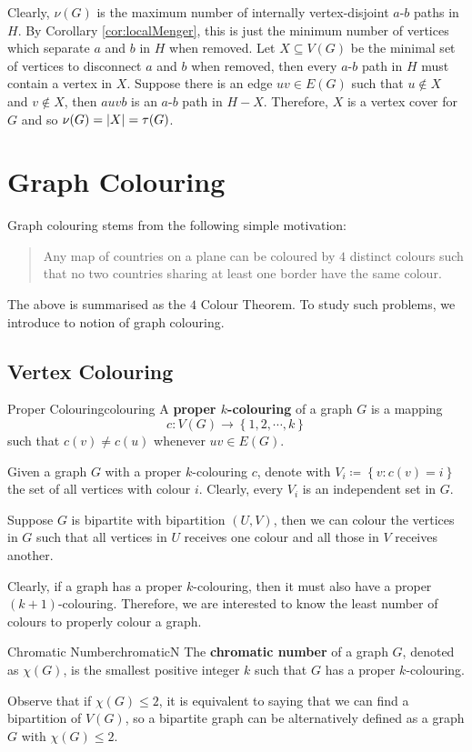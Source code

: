 \documentclass[math, code]{amznotes}
\theoremstyle{remark}
\begin{document}
Clearly, $\nu(G)$ is the maximum number of internally vertex-disjoint $a$-$b$ paths in $H$. By Corollary \ref{cor:localMenger}, this is just the minimum number of vertices which separate $a$ and $b$ in $H$ when removed. Let $X \subseteq V(G)$ be the minimal set of vertices to disconnect $a$ and $b$ when removed, then every $a$-$b$ path in $H$ must contain a vertex in $X$. Suppose there is an edge $uv \in E(G)$ such that $u \notin X$ and $v \notin X$, then $auvb$ is an $a$-$b$ path in $H - X$. Therefore, $X$ is a vertex cover for $G$ and so $\nu(G) = {\left\lvert {X} \right\rvert} = \tau(G)$.
\chapter{Graph Colouring}
Graph colouring stems from the following simple motivation:
\begin{quote}
    Any map of countries on a plane can be coloured by $4$ distinct colours such that no two countries sharing at least one border have the same colour.
\end{quote}
The above is summarised as the $4$ Colour Theorem. To study such problems, we introduce to notion of graph colouring.
\section{Vertex Colouring}
\begin{dfnbox}{Proper Colouring}{colouring}
    A {\color{red} \textbf{proper $k$-colouring}} of a graph $G$ is a mapping 
    \begin{equation*}
        c \colon V(G) \to \left\{1, 2, \cdots, k\right\}
    \end{equation*}
    such that $c(v) \neq c(u)$ whenever $uv \in E(G)$.
\end{dfnbox}
Given a graph $G$ with a proper $k$-colouring $c$, denote with $V_i \coloneqq \left\{v \colon c(v) = i\right\}$ the set of all vertices with colour $i$. Clearly, every $V_i$ is an independent set in $G$.

Suppose $G$ is bipartite with bipartition $(U, V)$, then we can colour the vertices in $G$ such that all vertices in $U$ receives one colour and all those in $V$ receives another.

Clearly, if a graph has a proper $k$-colouring, then it must also have a proper $(k + 1)$-colouring. Therefore, we are interested to know the least number of colours to properly colour a graph.
\begin{dfnbox}{Chromatic Number}{chromaticN}
    The {\color{red} \textbf{chromatic number}} of a graph $G$, denoted as $\chi(G)$, is the smallest positive integer $k$ such that $G$ has a proper $k$-colouring.
\end{dfnbox}
Observe that if $\chi(G) \leq 2$, it is equivalent to saying that we can find a bipartition of $V(G)$, so a bipartite graph can be alternatively defined as a graph $G$ with $\chi(G) \leq 2$. 
\end{document}
